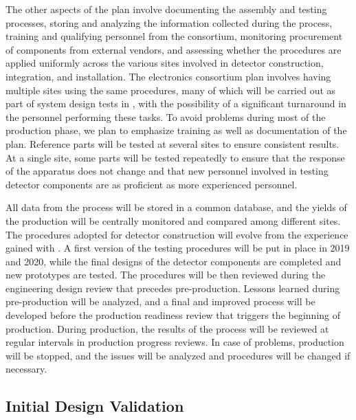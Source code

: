 The other aspects of the  plan involve documenting the 
assembly and testing processes, storing and analyzing the information
collected during the  process, training and qualifying 
personnel from the consortium, monitoring procurement of 
components from external vendors, and assessing whether the
 procedures are applied uniformly across
the various sites involved in detector construction, integration,
and installation. The  electronics consortium plan involves
having multiple sites using the same  procedures,
many of which will be carried out as part of system design tests in ,
with the possibility of a significant turnaround in the personnel
performing these tasks. To avoid problems during most of the
production phase, we plan to emphasize training as well as documentation
of the  plan. Reference parts will be tested at
several sites to ensure consistent results. At
a single site, some parts will be tested repeatedly to ensure
that the response of the apparatus does not change and
that new personnel involved in testing detector components are 
as proficient as more experienced personnel. 

All data from
the  process will be stored in a common database, and
the yields of the production will be centrally monitored and 
compared among different sites. The procedures adopted
for detector construction will evolve from the experience
gained with . A first version of the testing procedures
will be put in place in 2019 and 2020, while the final designs of
the detector components are completed and new prototypes are
tested. The  procedures will be then reviewed
during the engineering design review that precedes pre-production. Lessons learned during pre-production
will be analyzed, and a final and improved  process will be 
developed before the production readiness review that triggers
the beginning of production. During production, the results
of the  process will be reviewed at regular intervals
in production progress reviews. In case of problems, production
will be stopped, and the issues will be analyzed 
and procedures will be changed if necessary.

\subsection{Initial Design Validation}
\label{sec:fdsp-tpcelec-qa-initial}

